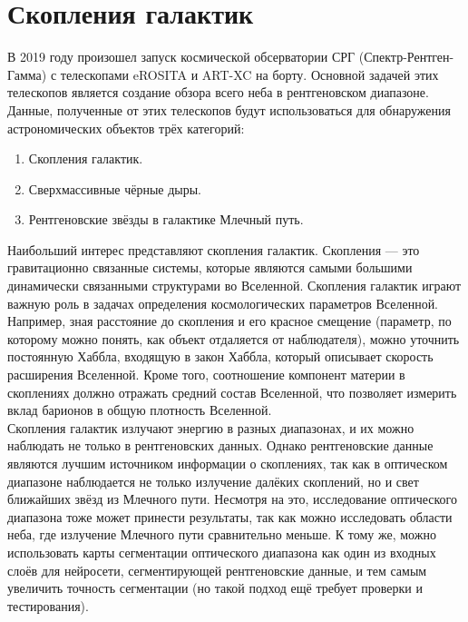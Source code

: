\Introduction
\section{Скопления галактик}
В 2019 году произошел запуск космической обсерватории СРГ (Спектр-Рентген-Гамма) с телескопами 
eROSITA и ART-XC на борту. Основной задачей этих телескопов является создание обзора всего неба в 
рентгеновском диапазоне. Данные, полученные от этих телескопов будут использоваться для обнаружения 
астрономических объектов трёх категорий:

\begin{enumerate}
    \item Скопления галактик.
    \item Сверхмассивные чёрные дыры.
    \item Рентгеновские звёзды в галактике Млечный путь. 
\end{enumerate}

Наибольший интерес представляют скопления галактик. Скопления --- это гравитационно связанные 
системы, которые являются самыми большими динамически связанными структурами во Вселенной. 
Скопления галактик играют важную роль в задачах определения космологических параметров Вселенной. 
Например, зная расстояние до скопления и его красное смещение (параметр, по которому можно понять, 
как объект отдаляется от наблюдателя), можно уточнить постоянную Хаббла, входящую в закон Хаббла, 
который описывает скорость расширения Вселенной. Кроме того, соотношение компонент материи в 
скоплениях должно отражать средний состав Вселенной, что позволяет измерить вклад барионов в общую
плотность Вселенной.\\

Скопления галактик излучают энергию в разных диапазонах, и их можно наблюдать не только в 
рентгеновских данных. Однако рентгеновские данные являются лучшим источником информации о скоплениях,
так как в оптическом диапазоне наблюдается не только излучение далёких скоплений, но и свет 
ближайших звёзд из Млечного пути. Несмотря на это, исследование оптического диапазона тоже может 
принести результаты, так как можно исследовать области неба, где излучение Млечного пути 
сравнительно меньше. К тому же, можно использовать карты сегментации оптического диапазона как один 
из входных слоёв для нейросети, сегментирующей рентгеновские данные, и тем самым увеличить точность 
сегментации (но такой подход ещё требует проверки и тестирования).\\

